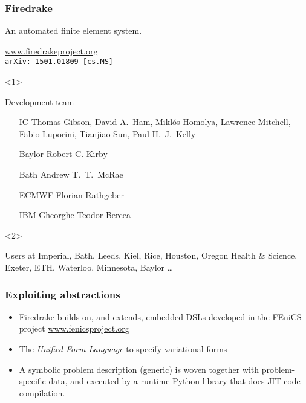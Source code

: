 \documentclass[presentation]{beamer}
\newcommand{\arxivlink}[2]{%
  \href{http://www.arxiv.org/abs/#1}%
  {{\small\texttt{arXiv:\,#1\,[#2]}}}%
}
\begin{document}
\begin{frame}
  \frametitle{Firedrake}
  An automated finite element system.

  \begin{center}
    \url{www.firedrakeproject.org}\\
    \cite{Rathgeber:2016} \arxivlink{1501.01809}{cs.MS}
  \end{center}

  \begin{onlyenv}<1>
    \begin{block}{Development team}
      \begin{itemize}
      \item[IC] Thomas Gibson, David A.~Ham, Mikl\'os Homolya,
        Lawrence Mitchell, {\color{black!50}Fabio Luporini}, Tianjiao
        Sun, Paul H.~J.~Kelly
      \item[\color{black!75}Baylor] {\color{black!75}Robert C. Kirby}
      \item[\color{black!75}Bath] {\color{black!75}Andrew T.~T.~McRae}
      \item[\color{black!25}ECMWF] {\color{black!25}Florian Rathgeber}
      \item[\color{black!15}IBM] {\color{black!15}Gheorghe-Teodor Bercea}
      \end{itemize}
    \end{block}
  \end{onlyenv}
  \begin{onlyenv}<2>
    \begin{block}{Users at}
      Imperial, Bath, Leeds, Kiel, Rice, Houston, Oregon Health \&
      Science, Exeter, ETH, Waterloo, Minnesota, Baylor \dots
    \end{block}
  \end{onlyenv}
\end{frame}

\begin{frame}
  \frametitle{Exploiting abstractions}
  \begin{itemize}
  \item Firedrake builds on, and extends, embedded DSLs developed in
    the FEniCS project \url{www.fenicsproject.org}
  \item The \emph{Unified Form Language} \parencite{Alnaes:2014} to
    specify variational forms
  \item A symbolic problem description (generic) is woven together with
    problem-specific data, and executed by a runtime Python library
    that does JIT code compilation.
  \end{itemize}
\end{frame}
\end{document}

